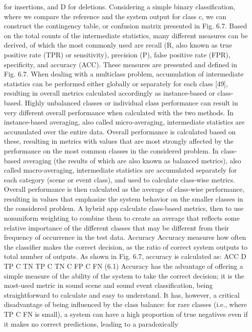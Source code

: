 for insertions, and D for deletions.
Considering a simple binary classification, where we compare the reference and
the system output for class c, we can construct the contingency table, or confusion
matrix presented in Fig. 6.7. Based on the total counts of the intermediate statistics,
many different measures can be derived, of which the most commonly used are
recall (R, also known as true positive rate (TPR) or sensitivity), precision (P), false
positive rate (FPR), specificity, and accuracy (ACC). These measures are presented
and defined in Fig. 6.7.
When dealing with a multiclass problem, accumulation of intermediate statistics
can be performed either globally or separately for each class [49], resulting in
overall metrics calculated accordingly as instance-based or class-based. Highly
unbalanced classes or individual class performance can result in very different
overall performance when calculated with the two methods. In instance-based
averaging, also called micro-averaging, intermediate statistics are accumulated over
the entire data. Overall performance is calculated based on these, resulting in metrics
with values that are most strongly affected by the performance on the most common
classes in the considered problem. In class-based averaging (the results of which
are also known as balanced metrics), also called macro-averaging, intermediate
statistics are accumulated separately for each category (scene or event class), and
used to calculate class-wise metrics. Overall performance is then calculated as the
average of class-wise performance, resulting in values that emphasize the system
behavior on the smaller classes in the considered problem. A hybrid app
calculate class-based metrics, then to use nonuniform weighting to combine them to
create an average that reflects some relative importance of the different classes that
may be different from their frequency of occurrence in the test data.
Accuracy Accuracy measures how often the classifier makes the correct decision,
as the ratio of correct system outputs to total number of outputs. As shown in
Fig. 6.7, accuracy is calculated as:
ACC D
TP C TN
TP C TN C FP C FN
(6.1)
Accuracy has the advantage of offering a simple measure of the ability of the system
to take the correct decision; it is the most-used metric in sound scene and sound
event classification, being straightforward to calculate and easy to understand. It
has, however, a critical disadvantage of being influenced by the class balance: for
rare classes (i.e., where TP C FN is small), a system can have a high proportion
of true negatives even if it makes no correct predictions, leading to a paradoxically
